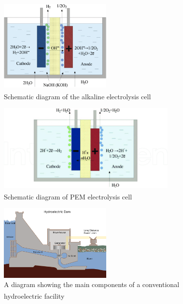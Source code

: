 \begin{figure}[p]
    \centering
    \includegraphics[width=0.5\textwidth]{Chapters/Pictures/Schematic-diagram-of-the-alkaline-electrolysis-cell-34.png}
    \caption{Schematic diagram of the alkaline electrolysis cell\textsuperscript{\cite{schemepictureelectrolysis}}}
    \label{fig:alkaline}
\end{figure}

\begin{figure}[p]
    \centering
    \includegraphics[width=0.8\textwidth]{Chapters/Pictures/Schematic-diagram-of-PEM-electrolysis-cell-33.png}
    \caption{Schematic diagram of PEM electrolysis cell\textsuperscript{\cite{schemepictureelectrolysis}}}
    \label{fig:pem}
\end{figure}

\begin{figure}[p]
    \centering
    \includegraphics[width=0.5\textwidth]{Chapters/Pictures/Damparts.png}
    \caption{\small{A diagram showing the main components of a conventional hydroelectric facility\textsuperscript{\cite{hydropowerscheme}}}}
    \label{fig:dam}
\end{figure}


